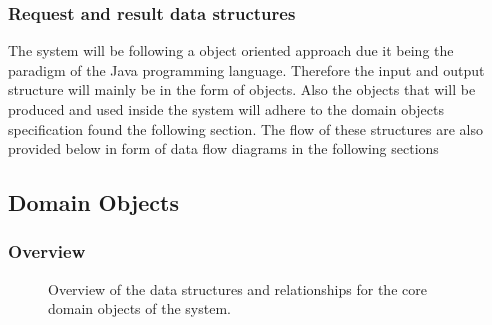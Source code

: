 \documentclass[12pt]{article}
\begin{document}
\subsubsection{Request and result data structures}
The system will be following a object oriented approach due it being the paradigm of the Java programming language. Therefore the input and output structure will mainly be in the form of objects. Also the objects that will be produced and used inside the system will adhere to the domain objects specification found the following section. The flow of these structures are also provided below in form of data flow diagrams in the following sections


\newpage
\subsection{Domain Objects}
\subsubsection{Overview}

\begin{figure}[H]
\centering	
{}
\caption{Overview of the data structures and relationships for the core domain objects of the
system.}
\end{figure}
\end{document}
